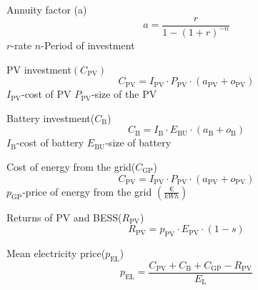 \documentclass[sigconf,12pt,nonacm]{acmart}
\begin{document}
Annuity factor (a)   
\begin{equation}a=\frac{r}{1-(1+r)^{-n}}\end{equation}
 $r$-rate $n$-Period of investment \newline
 
 PV investment$(C_{\mathrm{PV}})$
\begin{equation}C_{\mathrm{PV}}=I_{\mathrm{PV}} \cdot P_{\mathrm{PV}} \cdot\left(a_{\mathrm{PV}}+o_{\mathrm{PV}}\right)\end{equation}
$I_{\mathrm{PV}}$-cost of PV \newline
$P_{\mathrm{PV}}$-size of the PV\newline

Battery investment($C_{\mathrm{B}}$)
\begin{equation}C_{\mathrm{B}}=I_{\mathrm{B}} \cdot E_{\mathrm{BU}} \cdot\left(a_{\mathrm{B}}+o_{\mathrm{B}}\right)\end{equation}
$I_{\mathrm{B}}$-cost of battery \newline
$E_{\mathrm{BU}}$-size of battery\newline

Cost of energy from the grid($C_{\mathrm{GP}}$)
\begin{equation}C_{\mathrm{PV}}=I_{\mathrm{PV}} \cdot P_{\mathrm{PV}} \cdot\left(a_{\mathrm{PV}}+o_{\mathrm{PV}}\right)\end{equation}
$p_{\mathrm{GP}}$-price of energy from the grid $(\frac{\euro{}}{kWh})$ \newline

Returns of PV and BESS($R_{\mathrm{PV}}$) 
\begin{equation}R_{\mathrm{PV}}=p_{\mathrm{PV}} \cdot E_{\mathrm{PV}} \cdot(1-s)\end{equation} \newline

Mean electricity price($p_{\mathrm{EL}}$)  
\begin{equation}p_{\mathrm{EL}}=\frac{C_{\mathrm{PV}}+C_{\mathrm{B}}+C_{\mathrm{GP}}-R_{\mathrm{PV}}}{E_{\mathrm{L}}}\end{equation}
\end{document}
